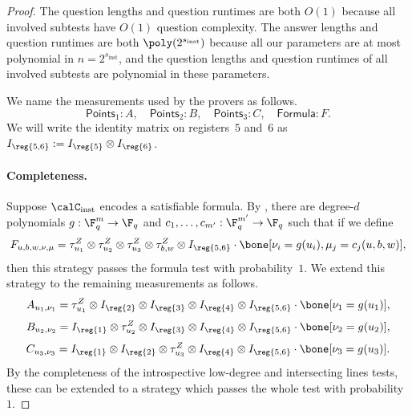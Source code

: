 \begin{proof}
The question lengths and question runtimes are both $O(1)$ because all involved subtests have $O(1)$ question complexity.
The answer lengths and question runtimes are both $\poly(2^{s_{\mathrm{inst}}})$
because all our parameters are at most polynomial in $n = 2^{s_{\mathrm{inst}}}$,
and the question lengths and question runtimes of all involved subtests are polynomial in these parameters.

We name the measurements used by the provers as follows.
\begin{equation*}
\mathsf{Points}_1: A,\quad
\mathsf{Points}_2: B,\quad
\mathsf{Points}_3: C,\quad
\mathsf{Formula}: F.
\end{equation*}
We will write the identity matrix on registers~$5$ and~$6$ as $I_{\reg{5, 6}} := I_{\reg{5}} \otimes I_{\reg{6}}$.

\paragraph{Completeness.}
Suppose $\calC_{\mathrm{inst}}$ encodes a satisfiable formula.
By , 
there are degree-$d$ polynomials $g:\F_q^m \rightarrow \F_q$ and $c_1, \ldots, c_{m'}:\F_q^{m'} \rightarrow \F_q$ such that if we define
\begin{equation*}
F_{u, b, w, \nu, \mu} =  \tau^Z_{u_1} \otimes \tau^Z_{u_2} \otimes \tau^Z_{u_3} \otimes \tau^Z_{b, w} \otimes I_{\reg{5,6}} \cdot \bone[\nu_i = g(u_i), \mu_j = c_j(u, b, w)],
\end{equation*}
then this strategy passes the formula test with probability~$1$.
We extend this strategy to the remaining measurements as follows.
\begin{equation*}
A_{u_1, \nu_1}
= \tau^Z_{u_1} \otimes I_{\reg{2}} \otimes I_{\reg{3}} \otimes I_{\reg{4}}\otimes I_{\reg{5,6}}\cdot \bone[\nu_1 = g(u_1)],
\end{equation*}
\begin{equation*}
B_{u_2, \nu_2}
= I_{\reg{1}} \otimes \tau^Z_{u_2} \otimes I_{\reg{3}} \otimes I_{\reg{4}} \otimes I_{\reg{5,6}} \cdot\bone[\nu_2 = g(u_2)],
\end{equation*}
\begin{equation*}
C_{u_3, \nu_3}
= I_{\reg{1}} \otimes I_{\reg{2}} \otimes \tau^Z_{u_3} \otimes I_{\reg{4}} \otimes I_{\reg{5, 6}}\cdot \bone[\nu_3 = g(u_3)].
\end{equation*}
By the completeness of the introspective low-degree and intersecting lines tests, these can be extended to a strategy which passes the whole test with probability~$1$.


\end{proof}
